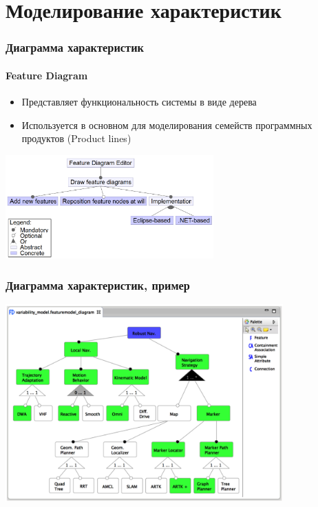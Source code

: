 \documentclass{../cscslides}
\begin{document}
    \section{Моделирование характеристик}

    \begin{frame}
        \frametitle{Диаграмма характеристик}
        \framesubtitle{Feature Diagram}
        \begin{itemize}
            \item Представляет функциональность системы в виде дерева
            \item Используется в основном для моделирования семейств программных продуктов (Product lines)
        \end{itemize}
        \begin{center}
            \includegraphics[width=0.6\textwidth]{featureDiagram.png}
        \end{center}
    \end{frame}

    \begin{frame}
        \frametitle{Диаграмма характеристик, пример}
        \begin{center}
            \includegraphics[width=0.8\textwidth]{featureDiagramExample.png}
        \end{center}
    \end{frame}
\end{document}
